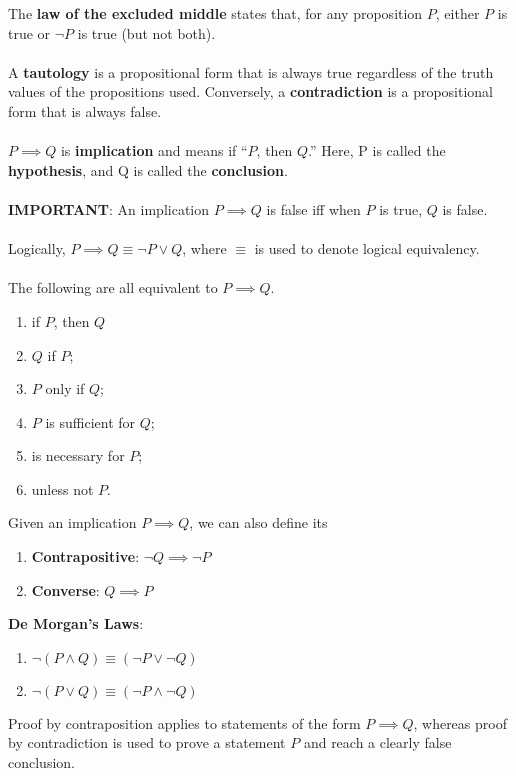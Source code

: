 \documentclass{article}
\theoremstyle{definition}
\begin{document}
The \textbf{law of the excluded middle} states that, for any proposition $P$, either $P$ is true or $\neg P$ is true (but not both). \\ \\
A \textbf{tautology} is a propositional form that is always true regardless of the truth values of the propositions used. Conversely, a \textbf{contradiction} is a propositional form that is always false. \\ \\
$P \implies Q$ is \textbf{implication} and means if  ``$P$, then $Q$.'' Here, P is called the \textbf{hypothesis}, and Q is called the \textbf{conclusion}. \\ \\
\textbf{IMPORTANT}: An implication $P \implies Q$ is false iff when $P$ is true, $Q$ is false. \\ \\
Logically, $P \implies Q \equiv \neg P \vee Q$, where $\equiv$ is used to denote logical equivalency. \\ \\
The following are all equivalent to $P \implies Q$. \begin{enumerate}
    \item if $P$, then $Q$
    \item $Q$ if $P$;
    \item $P$ only if $Q$;
    \item $P$ is sufficient for $Q$;
    \item is necessary for $P$;
    \item unless not $P$.
\end{enumerate} $ $ \\
Given an implication $P \implies Q$, we can also define its \begin{enumerate}
    \item \textbf{Contrapositive}: $\neg Q \implies \neg P$
    \item \textbf{Converse}: $Q \implies P$
\end{enumerate} $ $ \\
\textbf{De Morgan's Laws}: \begin{enumerate}
    \item $\neg(P \wedge  Q) \equiv (\neg P \vee \neg Q)$
    \item $\neg(P \vee Q) \equiv (\neg P \wedge \neg Q)$
\end{enumerate} $ $ \\
Proof by contraposition applies to statements of the form $P \implies Q$, whereas proof by contradiction is used to prove a statement $P$ and reach a clearly false conclusion.
\end{document}
